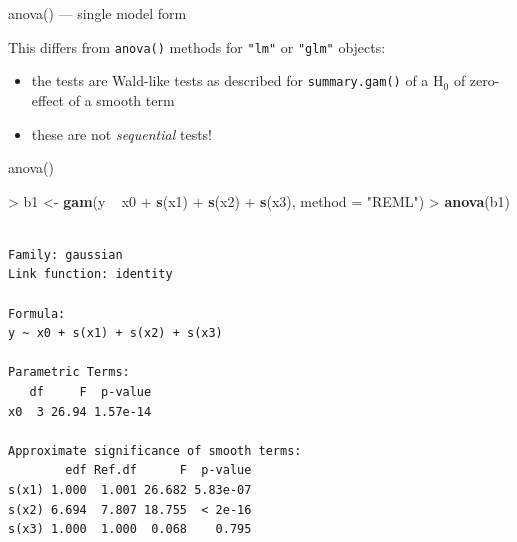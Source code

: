 \documentclass[10pt,ignorenonframetext,compress, aspectratio=169]{beamer}
\newenvironment{Shaded}{\begin{snugshade}}{\end{snugshade}}
\newcommand{\KeywordTok}[1]{\textcolor[rgb]{0.13,0.29,0.53}{\textbf{{#1}}}}
\newcommand{\DataTypeTok}[1]{\textcolor[rgb]{0.13,0.29,0.53}{{#1}}}
\newcommand{\StringTok}[1]{\textcolor[rgb]{0.31,0.60,0.02}{{#1}}}
\newcommand{\NormalTok}[1]{{#1}}
\providecommand{\tightlist}{%
  \setlength{\itemsep}{0pt}\setlength{\parskip}{0pt}}
\begin{document}
\begin{frame}[fragile]{anova() --- single model form}

This differs from \texttt{anova()} methods for \texttt{"lm"} or
\texttt{"glm"} objects:

\begin{itemize}
\tightlist
\item
  the tests are Wald-like tests as described for \texttt{summary.gam()}
  of a \(\mathrm{H}_0\) of zero-effect of a smooth term
\item
  these are not \emph{sequential} tests!
\end{itemize}

\end{frame}

\begin{frame}[fragile]{anova()}

\begin{Shaded}
\begin{Highlighting}[]
\NormalTok{>}\StringTok{ }\NormalTok{b1 <-}\StringTok{ }\KeywordTok{gam}\NormalTok{(y ~}\StringTok{ }\NormalTok{x0 +}\StringTok{ }\KeywordTok{s}\NormalTok{(x1) +}\StringTok{ }\KeywordTok{s}\NormalTok{(x2) +}\StringTok{ }\KeywordTok{s}\NormalTok{(x3), }\DataTypeTok{method =} \StringTok{"REML"}\NormalTok{)}
\NormalTok{>}\StringTok{ }\KeywordTok{anova}\NormalTok{(b1)}
\end{Highlighting}
\end{Shaded}

\begin{verbatim}

Family: gaussian 
Link function: identity 

Formula:
y ~ x0 + s(x1) + s(x2) + s(x3)

Parametric Terms:
   df     F  p-value
x0  3 26.94 1.57e-14

Approximate significance of smooth terms:
        edf Ref.df      F  p-value
s(x1) 1.000  1.001 26.682 5.83e-07
s(x2) 6.694  7.807 18.755  < 2e-16
s(x3) 1.000  1.000  0.068    0.795
\end{verbatim}

\end{frame}
\end{document}
